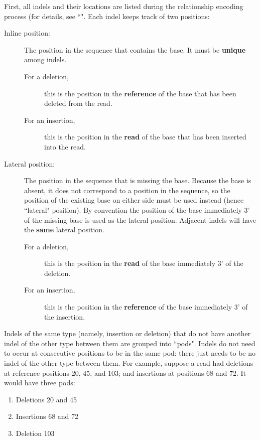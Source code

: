 \documentclass[11pt]{article}
\begin{document}
First, all indels and their locations are listed during the relationship encoding process (for details, see ``".
Each indel keeps track of two positions:
\begin{description}
    \item[Inline position:] The position in the sequence that contains the base. It must be \textbf{unique} among indels.
    \begin{description}
        \item[For a deletion,] this is the position in the \textbf{reference} of the base that has been deleted from the read.
        \item[For an insertion,] this is the position in the \textbf{read} of the base that has been inserted into the read.
    \end{description}
    \item[Lateral position:] The position in the sequence that is missing the base. Because the base is absent, it does not correspond to a position in the sequence, so the position of the existing base on either side must be used instead (hence ``lateral" position). By convention the position of the base immediately 3' of the missing base is used as the lateral position. Adjacent indels will have the \textbf{same} lateral position.
    \begin{description}
        \item[For a deletion,] this is the position in the \textbf{read} of the base immediately 3' of the deletion.
        \item[For an insertion,] this is the position in the \textbf{reference} of the base immediately 3' of the insertion.
    \end{description}
\end{description} 

Indels of the same type (namely, insertion or deletion) that do not have another indel of the other type between them are grouped into ``pods".
Indels do not need to occur at consecutive positions to be in the same pod: there just needs to be no indel of the other type between them.
For example, suppose a read had deletions at reference positions 20, 45, and 103; and insertions at positions 68 and 72.
It would have three pods:
\begin{enumerate}
    \item Deletions 20 and 45
    \item Insertions 68 and 72
    \item Deletion 103
\end{enumerate}
\end{document}
